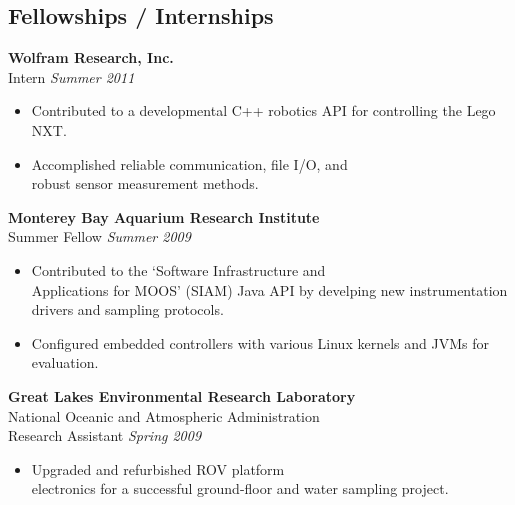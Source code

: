 \documentclass{article}
\begin{document}
{\begin{multicols}{2}
\section*{Fellowships / Internships}
\noindent
    \textbf{Wolfram Research, Inc. }\\
     Intern \hfill \textsl{Summer 2011} \\
    \vspace{ -10px}
    \begin{itemize}[noitemsep,nolistsep]
        \item Contributed to a developmental C++ robotics API for controlling the Lego NXT. 
	 \item Accomplished reliable communication, file I/O, and \\robust sensor measurement methods. 
    \end{itemize}
    \vspace{5px}
    \textbf{Monterey Bay Aquarium Research Institute}\\
     Summer Fellow \hfill \textsl{Summer 2009}  \\
    \vspace{ -10px}	
    \begin{itemize}[noitemsep,nolistsep]
	\item Contributed to the `Software Infrastructure and \\Applications for MOOS' (SIAM) Java API by develping new instrumentation drivers and sampling protocols.
	\item Configured embedded controllers with various Linux kernels and JVMs for evaluation.
    \end{itemize}
    \vspace{5px}
    \textbf{Great Lakes Environmental Research Laboratory}\\
    National Oceanic and Atmospheric Administration\\
    Research Assistant \hfill \textsl{Spring 2009} \\
    \vspace{ -10px}
    \begin{itemize}[noitemsep,nolistsep]
	\item Upgraded and refurbished ROV platform \\electronics for a successful ground-floor and water sampling project.

\end{itemize}
\end{multicols}}
\end{document}
